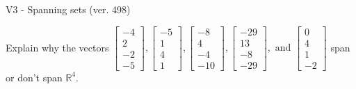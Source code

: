 \begin{exercise}
  \begin{exerciseTitle}V3 - Spanning sets (ver. 498)\end{exerciseTitle}
  \begin{exerciseStatement}
    Explain why the vectors \(\left[\begin{array}{r}
-4 \\
2 \\
-2 \\
-5
\end{array}\right] , \left[\begin{array}{r}
-5 \\
1 \\
4 \\
1
\end{array}\right] , \left[\begin{array}{r}
-8 \\
4 \\
-4 \\
-10
\end{array}\right] , \left[\begin{array}{r}
-29 \\
13 \\
-8 \\
-29
\end{array}\right] , \text{ and } \left[\begin{array}{r}
0 \\
4 \\
1 \\
-2
\end{array}\right]\) span or don't span \(\mathbb{R}^4\). 
	



\end{exerciseStatement}
\end{exercise}
